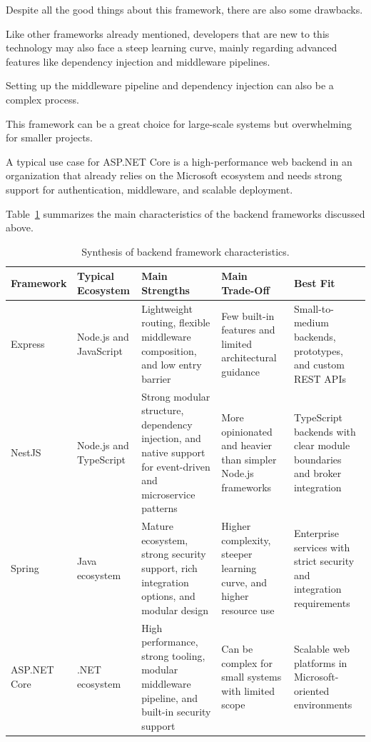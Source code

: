 Despite all the good things about this framework, there are also some drawbacks.

Like other frameworks already mentioned, developers that are new to this
technology may also face a steep learning curve, mainly regarding advanced
features like dependency injection and middleware pipelines.

Setting up the middleware pipeline and dependency injection can also be a complex
process.

This framework can be a great choice for large-scale systems but overwhelming
for smaller projects.

A typical use case for ASP.NET Core is a high-performance web backend in an
organization that already relies on the Microsoft ecosystem and needs strong
support for authentication, middleware, and scalable deployment.

Table~\ref{tab:backend-framework-synthesis} summarizes the main
characteristics of the backend frameworks discussed above.

\begin{table}[htbp]
	\centering
	\caption{Synthesis of backend framework characteristics.}
	\label{tab:backend-framework-synthesis}
	\renewcommand{\arraystretch}{1.15}
	\footnotesize
	\begin{tabularx}{\textwidth}{>{\raggedright\arraybackslash}p{1.9cm} >{\raggedright\arraybackslash}p{2.1cm} >{\raggedright\arraybackslash}X >{\raggedright\arraybackslash}p{2.6cm} >{\raggedright\arraybackslash}p{2.7cm}}
		\toprule
		\textbf{Framework} & \textbf{Typical Ecosystem} & \textbf{Main Strengths} & \textbf{Main Trade-Off} & \textbf{Best Fit} \\
		\midrule
		Express & Node.js and JavaScript & Lightweight routing, flexible middleware composition, and low entry barrier & Few built-in features and limited architectural guidance & Small-to-medium backends, prototypes, and custom \gls{REST} \gls{API}s \\
		NestJS & Node.js and TypeScript & Strong modular structure, dependency injection, and native support for event-driven and microservice patterns & More opinionated and heavier than simpler Node.js frameworks & TypeScript backends with clear module boundaries and broker integration \\
		Spring & Java ecosystem & Mature ecosystem, strong security support, rich integration options, and modular design & Higher complexity, steeper learning curve, and higher resource use & Enterprise services with strict security and integration requirements \\
		ASP.NET Core & .NET ecosystem & High performance, strong tooling, modular middleware pipeline, and built-in security support & Can be complex for small systems with limited scope & Scalable web platforms in Microsoft-oriented environments \\
		\bottomrule
	\end{tabularx}
\end{table}

